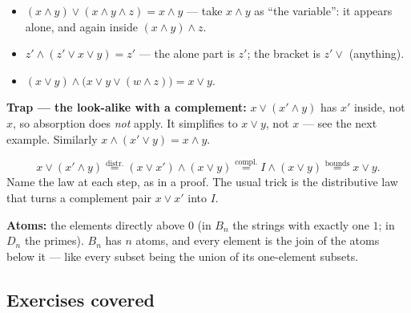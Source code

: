 \documentclass{fkt-notes}
\theoremstyle{definition}
\begin{document}
\begin{example}
  \begin{itemize}[nosep]
    \item $(x \wedge y) \vee (x \wedge y \wedge z) = x \wedge y$ ---
          take $x \wedge y$ as ``the variable'': it appears alone, and
          again inside $(x \wedge y) \wedge z$.
    \item $z' \wedge (z' \vee x \vee y) = z'$ --- the alone part is
          $z'$; the bracket is $z' \vee$ (anything).
    \item $(x \vee y) \wedge \bigl(x \vee y \vee (w \wedge z)\bigr) = x \vee y$.
  \end{itemize}
\end{example}

\textbf{Trap --- the look-alike with a complement:} $x \vee (x' \wedge y)$
has $x'$ inside, not $x$, so absorption does \emph{not} apply. It
simplifies to $x \vee y$, not $x$ --- see the next example. Similarly
$x \wedge (x' \vee y) = x \wedge y$.

\begin{example}
  \[
    x \vee (x' \wedge y)
    \overset{\text{distr.}}{=} (x \vee x') \wedge (x \vee y)
    \overset{\text{compl.}}{=} I \wedge (x \vee y)
    \overset{\text{bounds}}{=} x \vee y.
  \]
  Name the law at each step, as in a proof. The usual trick is the
  distributive law that turns a complement pair $x \vee x'$ into $I$.
\end{example}

\textbf{Atoms:} the elements directly above $0$ (in $B_n$
the strings with exactly one $1$; in $D_n$ the primes). $B_n$ has $n$
atoms, and every element is the join of the atoms below it ---
like every subset being the union of its one-element subsets.

\subsection{Exercises covered}
\end{document}
